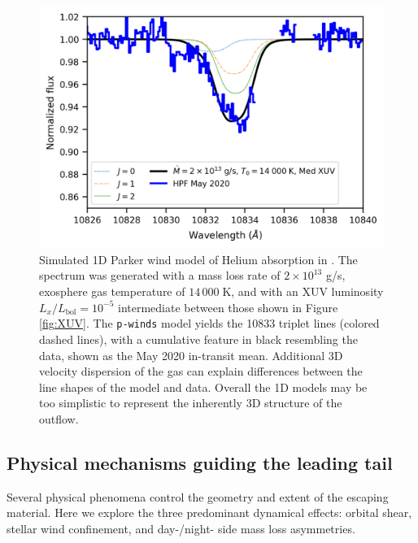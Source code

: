 \documentclass[twocolumn]{aastex631}
\newcommand{\hatpb}{\object{HAT-P-67 b}}
\begin{document}
\begin{figure}
    \includegraphics[width=\linewidth]{figures/pwinds_May2020_14000_2e13Mdot_medXUV_formal_rv_rev.png}
    \caption{Simulated 1D Parker wind model of Helium absorption in \hatpb.  The spectrum was generated with a mass loss rate of $2\times10^{13}$ g/s, exosphere gas temperature of $14\,000\;$K, and with an XUV luminosity $L_x/L_\mathrm{bol}=10^{-5}$ intermediate between those shown in Figure \ref{fig:XUV}.  The \texttt{p-winds} model yields the  10833 triplet lines (colored dashed lines), with a cumulative feature in black resembling the data, shown as the May 2020 in-transit mean.  Additional 3D velocity dispersion of the gas can explain differences between the line shapes of the model and data.  Overall the 1D models may be too simplistic to represent the inherently 3D structure of the outflow.}
    \label{fig:pwinds}
\end{figure}

\subsection{Physical mechanisms guiding the leading tail} \label{secLeading}
Several physical phenomena control the geometry and extent of the escaping material.  Here we explore the three predominant dynamical effects: orbital shear, stellar wind confinement, and day-/night- side mass loss asymmetries.
\end{document}
